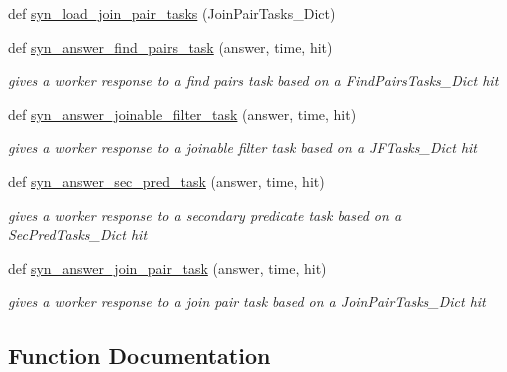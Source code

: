 \begin{DoxyCompactItemize}
def \mbox{\hyperlink{namespacejoinapp_1_1synthetic__data_a18d0c22966d3c7e8bd7d8d79f95f8a02}{syn\+\_\+load\+\_\+join\+\_\+pair\+\_\+tasks}} (Join\+Pair\+Tasks\+\_\+\+Dict)
\item 
def \mbox{\hyperlink{namespacejoinapp_1_1synthetic__data_acca01c05ef215c902a6bef7f8a2cf461}{syn\+\_\+answer\+\_\+find\+\_\+pairs\+\_\+task}} (answer, time, hit)
\begin{DoxyCompactList}\small\item\em gives a worker response to a find pairs task based on a Find\+Pairs\+Tasks\+\_\+\+Dict hit \end{DoxyCompactList}\item 
def \mbox{\hyperlink{namespacejoinapp_1_1synthetic__data_ac76596b09f4f089a86c41525ae9fc069}{syn\+\_\+answer\+\_\+joinable\+\_\+filter\+\_\+task}} (answer, time, hit)
\begin{DoxyCompactList}\small\item\em gives a worker response to a joinable filter task based on a J\+F\+Tasks\+\_\+\+Dict hit \end{DoxyCompactList}\item 
def \mbox{\hyperlink{namespacejoinapp_1_1synthetic__data_a0dab322f06917c77e4a5061b9e70474a}{syn\+\_\+answer\+\_\+sec\+\_\+pred\+\_\+task}} (answer, time, hit)
\begin{DoxyCompactList}\small\item\em gives a worker response to a secondary predicate task based on a Sec\+Pred\+Tasks\+\_\+\+Dict hit \end{DoxyCompactList}\item 
def \mbox{\hyperlink{namespacejoinapp_1_1synthetic__data_a5085597abd3e5d1c9a0487ffeef2d142}{syn\+\_\+answer\+\_\+join\+\_\+pair\+\_\+task}} (answer, time, hit)
\begin{DoxyCompactList}\small\item\em gives a worker response to a join pair task based on a Join\+Pair\+Tasks\+\_\+\+Dict hit \end{DoxyCompactList}\end{DoxyCompactItemize}


\subsection{Function Documentation}
\mbox{\label{namespacejoinapp_1_1synthetic__data_acca01c05ef215c902a6bef7f8a2cf461}} 
